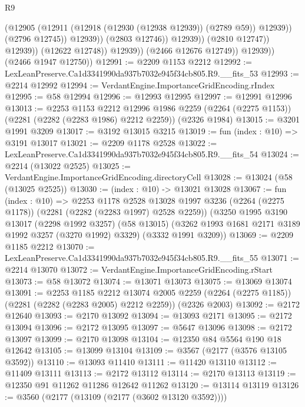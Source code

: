 \begin{lexlean}{R9}
\begin{coremodule}
                                    (@12905
                                      (@12911 (@12918 (@12930 (@12938 @12939)) (@2789 @59)) @12939))
                                    (@2796 @12745))
                                  @12939))
                              (@2803 @12746))
                            @12939))
                        (@2810 @12747))
                      @12939))
                  (@12622 @12748))
                @12939))
            (@2466 @12676 @12749))
          @12939))
      (@2466 @1947 @12750))
@12991 := @2209 @1153 @2212
@12992 := LexLeanPreserve.Ca1d3341990da937b7032e945f34cb805.R9.__fits_53
@12993 := @2214 @12992
@12994 := VerdantEngine.ImportanceGridEncoding.rIndex
@12995 := @58 @12994
@12996 := @12993 @12995
@12997 := @12991 @12996
@13013 := @2253
    @1153
    @2212
    @12996
    @1986
    @2259
    (@2264 (@2275 @1153))
    (@2281 (@2282 (@2283 @1986) @2212 @2259))
    (@2326 @1984)
@13015 := @3201 @1991 @3209
@13017 := @3192 @13015 @3215
@13019 := fun (index : @10) => @3191 @13017
@13021 := @2209 @1178 @2528
@13022 := LexLeanPreserve.Ca1d3341990da937b7032e945f34cb805.R9.__fits_54
@13024 := @2214 (@13022 @2525)
@13025 := VerdantEngine.ImportanceGridEncoding.directoryCell
@13028 := @13024 (@58 (@13025 @2525))
@13030 := (index : @10) -> @13021 @13028
@13067 := fun (index : @10) =>
  @2253
    @1178
    @2528
    @13028
    @1997
    @3236
    (@2264 (@2275 @1178))
    (@2281 (@2282 (@2283 @1997) @2528 @2259))
    (@3250
      @1995
      @3190
      @13017
      (@2298 @1992 @3257)
      (@58 @13015)
      (@3262 @1993 @1681 @2171 @3189 @1992 @3257 (@3270 @1992) @3329)
      (@3332 @1991 @3209))
@13069 := @2209 @1185 @2212
@13070 := LexLeanPreserve.Ca1d3341990da937b7032e945f34cb805.R9.__fits_55
@13071 := @2214 @13070
@13072 := VerdantEngine.ImportanceGridEncoding.rStart
@13073 := @58 @13072
@13074 := @13071 @13073
@13075 := @13069 @13074
@13091 := @2253
    @1185
    @2212
    @13074
    @2005
    @2259
    (@2264 (@2275 @1185))
    (@2281 (@2282 (@2283 @2005) @2212 @2259))
    (@2326 @2003)
@13092 := @2172 @12640
@13093 := @2170 @13092
@13094 := @13093 @2171
@13095 := @2172 @13094
@13096 := @2172 @13095
@13097 := @5647 @13096
@13098 := @2172 @13097
@13099 := @2170 @13098
@13104 := @12350 @84 @5564 @190 @18 @12642
@13105 := @13099 @13104
@13109 := @3567 (@2177 (@3576 @13105 @3592))
@13110 := @13093 @11410
@13111 := @11420 @13110
@13112 := @11409 @13111
@13113 := @2172 @13112
@13114 := @2170 @13113
@13119 := @12350 @91 @11262 @11286 @12642 @11262
@13120 := @13114 @13119
@13126 := @3560 (@2177 (@13109 (@2177 (@3602 @13120 @3592))))

\end{coremodule}
\end{lexlean}

